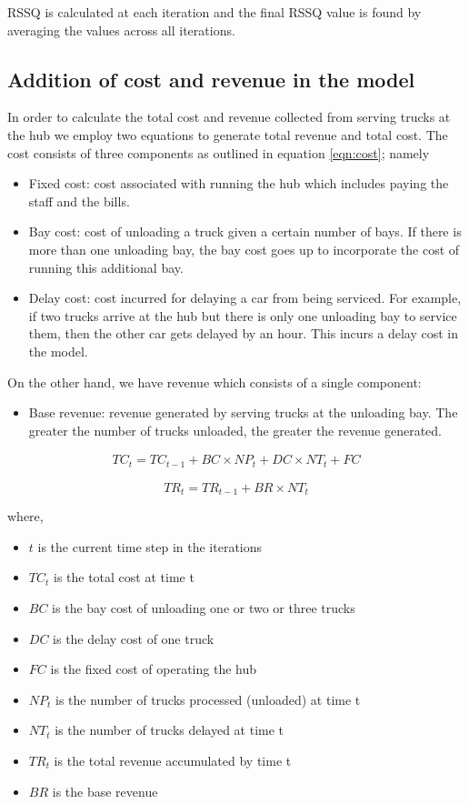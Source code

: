 \documentclass{article}
\theoremstyle{definition}
\theoremstyle{remark}
\numberwithin{equation}{section}
\begin{document}
RSSQ is calculated at each iteration and the final RSSQ value is found by averaging the values across all iterations.

\subsection{Addition of cost and revenue in the model}

In order to calculate the total cost and revenue collected from serving trucks at the hub we employ two equations to generate total revenue and total cost. The cost consists of three components as outlined in equation \ref{eqn:cost}; namely 
\begin{itemize}
    \item Fixed cost: cost associated with running the hub which includes paying the staff and the bills.
    \item Bay cost: cost of unloading a truck given a certain number of bays. If there is more than one unloading bay, the bay cost goes up to incorporate the cost of running this additional bay.
    \item Delay cost: cost incurred for delaying a car from being serviced. For example, if two trucks arrive at the hub but there is only one unloading bay to service them, then the other car gets delayed by an hour. This incurs a delay cost in the model.
\end{itemize}

On the other hand, we have revenue which consists of a single component: 
\begin{itemize}
    \item Base revenue: revenue generated by serving trucks at the unloading bay. The greater the number of trucks unloaded, the greater the revenue generated. 
\end{itemize}

\begin{align}
    \label{eqn:cost} TC_t = TC_{t-1} +  BC \times NP_t + DC \times NT_t  + FC
\end{align}

\begin{equation}
    \label{eqn:revenue}TR_t = TR_{t-1} + BR \times NT_t
\end{equation}

where, 
\begin{itemize}
    \item $t$ is the current time step in the iterations
    \item $TC_t$ is the total cost at time t 
    \item $BC$ is the bay cost of unloading one or two or three trucks
    \item $DC$ is the delay cost of one truck
    \item $FC$ is the fixed cost of operating the hub
    \item $NP_t$ is the number of trucks processed (unloaded) at time t
    \item $NT_t$ is the number of trucks delayed at time t
    \item $TR_t$ is the total revenue accumulated by time t
    \item $BR$ is the base revenue
\end{itemize}
\end{document}
